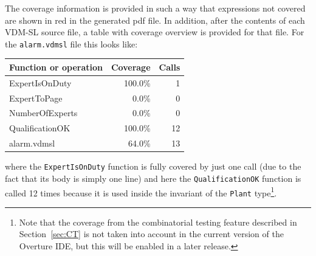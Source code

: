 %
The coverage information is provided in such a way that expressions not covered are shown in red in the generated pdf file. In addition, after the contents of each VDM-SL source file, a table with coverage overview is provided for that file. For the \texttt{alarm.vdmsl} file this looks like:
%
\begin{longtable}{|l|r|r|}
\hline
Function or operation & Coverage & Calls \\
\hline
\hline
ExpertIsOnDuty & 100.0\% & 1 \\
\hline
ExpertToPage & 0.0\% & 0 \\
\hline
NumberOfExperts & 0.0\% & 0 \\
\hline
QualificationOK & 100.0\% & 12 \\
\hline
\hline
alarm.vdmsl & 64.0\% & 13 \\
\hline
\end{longtable}
%
\noindent where the \texttt{ExpertIsOnDuty} function is fully covered by just one call (due to the fact that its body is simply one line) and here the \texttt{QualificationOK} function is called 12 times
because it is used inside the invariant of the \texttt{Plant} type\footnote{Note that the coverage from the combinatorial testing feature described in Section~\ref{sec:CT} is not taken into account in the current version of the Overture IDE, but this will be enabled in a later release.}.
%
%
